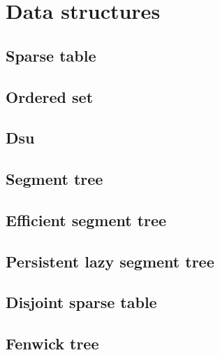 \section{Data structures}

\subsection{Sparse table}

\subsection{Ordered set}

\subsection{Dsu}

\subsection{Segment tree}

\subsection{Efficient segment tree}

\subsection{Persistent lazy segment tree}

\subsection{Disjoint sparse table}

\subsection{Fenwick tree}
